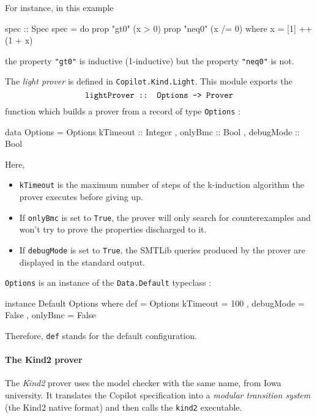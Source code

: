 For instance, in this example

\begin{code}
spec :: Spec
spec = do
  prop "gt0"  (x > 0)
  prop "neq0" (x /= 0)
  where
    x = [1] ++ (1 + x)
\end{code}

the property \texttt{"gt0"} is inductive (1-inductive) but the property
\texttt{"neq0"} is not.

The \emph{light prover} is defined in \texttt{Copilot.Kind.Light}. This
module exports the 
$$\texttt{lightProver :: Options -\textgreater{} Prover}$$ function which
builds a prover from a record of type \texttt{Options} :

\begin{code}
data Options = Options 
  { kTimeout  :: Integer
  , onlyBmc   :: Bool
  , debugMode :: Bool } 

\end{code}
Here,

\begin{itemize}
\itemsep1pt\parskip0pt
\item
  \texttt{kTimeout} is the maximum number of steps of the k-induction
  algorithm the prover executes before giving up.
\item
  If \texttt{onlyBmc} is set to \texttt{True}, the prover will only
  search for counterexamples and won't try to prove the properties
  discharged to it.
\item
  If \texttt{debugMode} is set to \texttt{True}, the SMTLib queries
  produced by the prover are displayed in the standard output.
\end{itemize}

\texttt{Options} is an instance of the \texttt{Data.Default} typeclass :

\begin{code}
instance Default Options where
  def = Options 
    { kTimeout  = 100
    , debugMode = False 
    , onlyBmc   = False }

\end{code}

Therefore, \texttt{def} stands for the default configuration.

\paragraph{The Kind2 prover}\label{the-kind2-prover}

The \emph{Kind2} prover uses the model checker with the same name, from
Iowa university. It translates the Copilot specification into a
\emph{modular transition system} (the Kind2 native format) and then
calls the \texttt{kind2} executable.

